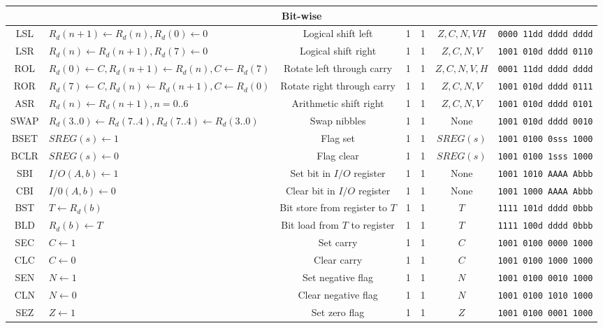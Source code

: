 \documentclass[11pt]{article}
\begin{document}
\begin{center}
\begin{longtable}{|c|m{12em}|c|c|c|c|c|}
\hline\hline
\multicolumn{7}{|c|}{Bit-wise} \\
\hline
LSL & $R_d(n+1) \leftarrow R_d(n), R_d(0) \leftarrow 0$ & Logical shift left & 1 & 1 & $Z, C, N, V H$ & \texttt{0000 11dd dddd dddd}\\
LSR & $R_d(n) \leftarrow R_d(n+1), R_d(7) \leftarrow 0$ & Logical shift right & 1 & 1 & $Z, C, N, V$ & \texttt{1001 010d dddd 0110}\\
ROL & $R_d(0) \leftarrow C, R_d(n+1) \leftarrow R_d(n), C \leftarrow R_d(7)$ & Rotate left through carry & 1 & 1 & $Z, C, N, V, H$ & \texttt{0001 11dd dddd dddd}\\
ROR & $R_d(7) \leftarrow C, R_d(n) \leftarrow R_d(n+1), C \leftarrow R_d(0)$ & Rotate right through carry & 1 & 1 & $Z, C, N, V$ & \texttt{1001 010d dddd 0111}\\
ASR & $R_d(n) \leftarrow R_d(n+1), n=0..6$ & Arithmetic shift right & 1 & 1 & $Z, C, N, V$ & \texttt{1001 010d dddd 0101}\\
SWAP & $R_d(3..0) \leftarrow R_d(7..4), R_d(7..4) \leftarrow R_d(3..0)$ & Swap nibbles & 1 & 1 & None & \texttt{1001 010d dddd 0010}\\
BSET & $SREG(s) \leftarrow 1$ & Flag set & 1 & 1 & $SREG(s)$ & \texttt{1001 0100 0sss 1000}\\
BCLR & $SREG(s) \leftarrow 0$ & Flag clear & 1 & 1 & $SREG(s)$ & \texttt{1001 0100 1sss 1000}\\
SBI & $I/O(A, b) \leftarrow 1$ & Set bit in $I/O$ register & 1 & 1 & None & \texttt{1001 1010 AAAA Abbb}\\
CBI & $I/0(A, b) \leftarrow 0$ & Clear bit in $I/O$ register & 1 & 1 & None & \texttt{1001 1000 AAAA Abbb}\\
BST & $T \leftarrow R_d(b)$ & Bit store from register to $T$ & 1 & 1 & $T$ & \texttt{1111 101d dddd 0bbb}\\
BLD & $R_d(b) \leftarrow T$ & Bit load from $T$ to register & 1 & 1 & $T$ & \texttt{1111 100d dddd 0bbb}\\
SEC & $C \leftarrow 1$ & Set carry & 1 & 1 & $C$ & \texttt{1001 0100 0000 1000}\\
CLC & $C \leftarrow 0$ & Clear carry & 1 & 1 & $C$ & \texttt{1001 0100 1000 1000}\\
SEN & $N \leftarrow 1$ & Set negative flag & 1 & 1 & $N$ & \texttt{1001 0100 0010 1000}\\
CLN & $N \leftarrow 0$ & Clear negative flag & 1 & 1 & $N$ & \texttt{1001 0100 1010 1000}\\
SEZ & $Z \leftarrow 1$ & Set zero flag & 1 & 1 & $Z$ & \texttt{1001 0100 0001 1000}\\

\end{longtable}
\end{center}
\end{document}
